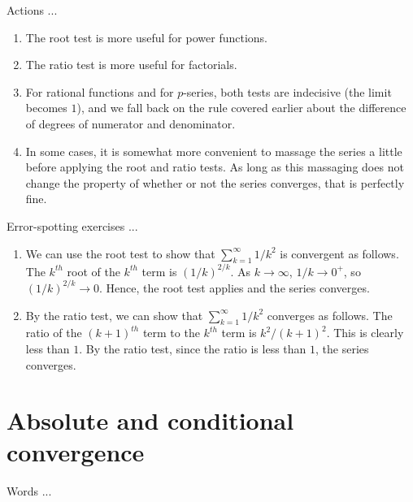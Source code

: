 \documentclass[10pt]{amsart}
\begin{document}
Actions ...

\begin{enumerate}
\item The root test is more useful for power functions.
\item The ratio test is more useful for factorials.
\item For rational functions and for $p$-series, both tests are
  indecisive (the limit becomes $1$), and we fall back on the rule
  covered earlier about the difference of degrees of numerator and
  denominator.
\item In some cases, it is somewhat more convenient to massage the
  series a little before applying the root and ratio tests. As long as
  this massaging does not change the property of whether or not the
  series converges, that is perfectly fine.
\end{enumerate}

Error-spotting exercises ...

\begin{enumerate}
\item We can use the root test to show that $\sum_{k=1}^\infty 1/k^2$
  is convergent as follows. The $k^{th}$ root of the $k^{th}$ term is
  $(1/k)^{2/k}$. As $k \to \infty$, $1/k \to 0^+$, so $(1/k)^{2/k} \to
  0$. Hence, the root test applies and the series converges.
\item By the ratio test, we can show that $\sum_{k=1}^\infty 1/k^2$
  converges as follows. The ratio of the $(k+1)^{th}$ term to the
  $k^{th}$ term is $k^2/(k + 1)^2$. This is clearly less than $1$. By
  the ratio test, since the ratio is less than $1$, the series
  converges.
\end{enumerate}

\section{Absolute and conditional convergence}

Words ...
\end{document}

